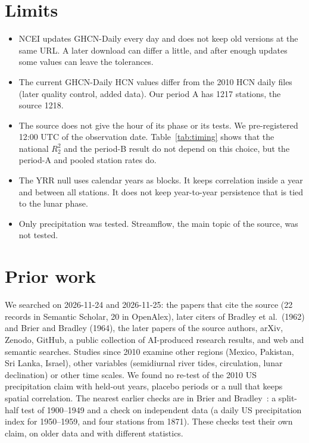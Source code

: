 \documentclass[11pt]{article}
\newcommand{\Rtwo}{R^2_2}
\begin{document}
\section{Limits}
\begin{itemize}
\item NCEI updates GHCN-Daily every day and does not keep old versions at the same URL. A later download can differ a little, and after enough updates some values can leave the tolerances.
\item The current GHCN-Daily HCN values differ from the 2010 HCN daily files (later quality control, added data). Our period A has 1217 stations, the source 1218.
\item The source does not give the hour of its phase or its tests. We pre-registered 12:00 UTC of the observation date. Table~\ref{tab:timing} shows that the national $\Rtwo$ and the period-B result do not depend on this choice, but the period-A and pooled station rates do.
\item The YRR null uses calendar years as blocks. It keeps correlation inside a year and between all stations. It does not keep year-to-year persistence that is tied to the lunar phase.
\item Only precipitation was tested. Streamflow, the main topic of the source, was not tested.
\end{itemize}

\section{Prior work}\label{sec:prior}
We searched on 2026-11-24 and 2026-11-25: the papers that cite the source (22 records in Semantic Scholar, 20 in OpenAlex), later citers of Bradley et al.\ (1962) and Brier and Bradley (1964), the later papers of the source authors, arXiv, Zenodo, GitHub, a public collection of AI-produced research results, and web and semantic searches. Studies since 2010 examine other regions (Mexico, Pakistan, Sri Lanka, Israel), other variables (semidiurnal river tides, circulation, lunar declination) or other time scales. We found no re-test of the 2010 US precipitation claim with held-out years, placebo periods or a null that keeps spatial correlation. The nearest earlier checks are in Brier and Bradley~\cite{brier1964}: a split-half test of 1900--1949 and a check on independent data (a daily US precipitation index for 1950--1959, and four stations from 1871). These checks test their own claim, on older data and with different statistics.
\end{document}
